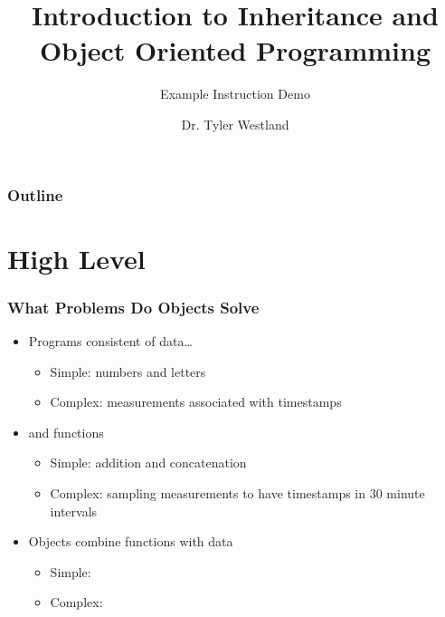 \documentclass{beamer}
\title[Intro to Inheritance \& OOP]{Introduction to Inheritance and Object Oriented Programming}
\subtitle{Example Instruction Demo}
\author{Dr. Tyler Westland}
\date{}
\begin{document}
 
\begin{frame}
\titlepage
\end{frame}

\begin{frame}
\frametitle{Outline}
\tableofcontents
\end{frame}

\section{High Level}
  \begin{frame}
    \frametitle{What Problems Do Objects Solve}
    \begin{itemize}
      \item<1-> Programs consistent of data\ldots
        \begin{itemize}
          \item Simple: numbers and letters
          \item Complex: measurements associated with timestamps
        \end{itemize}
      \item<2-> and functions
        \begin{itemize} \item Simple: addition and concatenation
          \item Complex: sampling measurements to have timestamps in 30 minute intervals
        \end{itemize}
      \item<3-> Objects combine functions with data
        \begin{itemize}
          \item Simple:
          \item Complex: 
        \end{itemize}
    \end{itemize}
  \end{frame}
\end{document}
